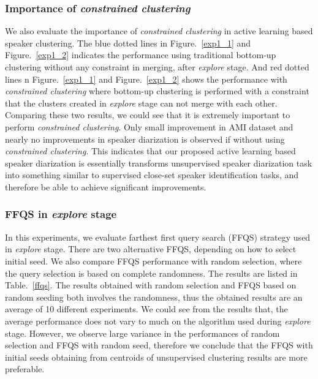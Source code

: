 \documentclass[journal]{IEEEtran}
\begin{document}
\subsubsection{Importance of \textit{constrained clustering}}
We also evaluate the importance of \textit{constrained clustering} in active learning based speaker clustering. The blue dotted lines in Figure.~\ref{exp1_1} and Figure.~\ref{exp1_2} indicates the performance using traditional bottom-up clustering without any constraint in merging, after \textit{explore} stage. And red dotted lines n Figure.~\ref{exp1_1} and Figure.~\ref{exp1_2} shows the performance with \textit{constrained clustering} where bottom-up clustering is performed with a constraint that the clusters created in \textit{explore} stage can not merge with each other. Comparing these two results, we could see that it is extremely important to perform \textit{constrained clustering}. Only small improvement in AMI dataset and nearly no improvements in speaker diarization is observed if without using \textit{constrained clustering}. This indicates that our proposed active learning based speaker diarization is essentially transforms unsupervised speaker diarization task into something similar to supervised close-set speaker identification tasks, and therefore be able to achieve significant improvements.

\subsubsection{FFQS in \textit{explore} stage}
In this experiments, we evaluate farthest first query search (FFQS) strategy used in \textit{explore} stage. There are two alternative FFQS, depending on how to select initial seed. We also compare FFQS performance with random selection, where the query selection is based on complete randomness. The results are listed in Table.~\ref{ffqs}. The results obtained with random selection and FFQS based on random seeding both involves the randomness, thus the obtained results are an average of 10 different experiments. We could see from the results that, the average performance does not vary to much on the algorithm used during \textit{explore} stage. However, we observe large variance in the performances of random selection and FFQS with random seed, therefore we conclude that the FFQS with initial seeds obtaining from centroids of unsupervised clustering results are more preferable.
\end{document}
